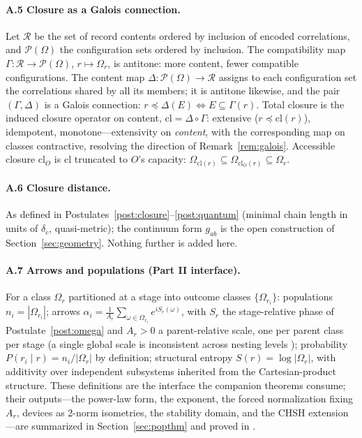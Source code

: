 \documentclass[11pt]{article}
\theoremstyle{definition}
\theoremstyle{remark}
\begin{document}
\paragraph{A.5 Closure as a Galois connection.} Let $\mathcal{R}$ be the set of record contents ordered by inclusion of encoded correlations, and $\mathcal{P}(\Omega)$ the configuration sets ordered by inclusion. The compatibility map $\Gamma : \mathcal{R} \to \mathcal{P}(\Omega)$, $r \mapsto \Omega_r$, is antitone: more content, fewer compatible configurations. The content map $\Delta : \mathcal{P}(\Omega) \to \mathcal{R}$ assigns to each configuration set the correlations shared by all its members; it is antitone likewise, and the pair $(\Gamma, \Delta)$ is a Galois connection: $r \preceq \Delta(E) \iff E \subseteq \Gamma(r)$. Total closure is the induced closure operator on content, $\mathrm{cl} = \Delta \circ \Gamma$: extensive ($r \preceq \mathrm{cl}(r)$), idempotent, monotone---extensivity on \emph{content}, with the corresponding map on classes contractive, resolving the direction of Remark~\ref{rem:galois}. Accessible closure $\mathrm{cl}_O$ is $\mathrm{cl}$ truncated to $O$'s capacity: $\Omega_{\mathrm{cl}(r)} \subseteq \Omega_{\mathrm{cl}_O(r)} \subseteq \Omega_r$.

\paragraph{A.6 Closure distance.} As defined in Postulates~\ref{post:closure}--\ref{post:quantum} (minimal chain length in units of $\delta_c$, quasi-metric); the continuum form $g_{ab}$ is the open construction of Section~\ref{sec:geometry}. Nothing further is added here.

\paragraph{A.7 Arrows and populations (Part II interface).} For a class $\Omega_r$ partitioned at a stage into outcome classes $\{\Omega_{r_i}\}$: populations $n_i = |\Omega_{r_i}|$; arrows $\alpha_i = \frac{1}{A_r} \sum_{\omega \in \Omega_{r_i}} e^{iS_r(\omega)}$, with $S_r$ the stage-relative phase of Postulate~\ref{post:omega} and $A_r > 0$ a parent-relative scale, one per parent class per stage (a single global scale is inconsistent across nesting levels \cite{TillittBorn}); probability $P(r_i \mid r) = n_i / |\Omega_r|$ by definition; structural entropy $S(r) = \log|\Omega_r|$, with additivity over independent subsystems inherited from the Cartesian-product structure. These definitions are the interface the companion theorems consume; their outputs---the power-law form, the exponent, the forced normalization fixing $A_r$, devices as 2-norm isometries, the stability domain, and the CHSH extension---are summarized in Section~\ref{sec:popthm} and proved in \cite{TillittBorn,TillittCHSH}.
\end{document}
